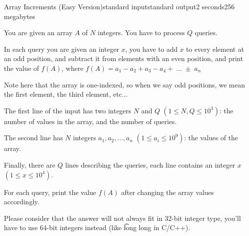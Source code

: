 \begin{problem}{Array Increments (Easy Version)}{standard input}{standard output}{2 seconds}{256 megabytes}

You are given an array $A$ of $N$ integers. You have to process $Q$ queries.

In each query you are given an integer $x$, you have to add $x$ to every element at an odd position, and subtract it from elements with an even position, and print the value of $f(A)$, where $f(A) = a_1 - a_2 + a_3 - a_4 +\; \dots \; \pm \; a_n$

Note here that the array is one-indexed, so when we say odd positions, we mean the first element, the third element, etc...

\InputFile
The first line of the input has two integers $N$ and $Q$ $(1 \leq N,Q \leq 10^3)$: the number of values in the array, and the number of queries.

The second line has $N$ integers $a_1, a_2, \dots, a_n$ $(1 \leq a_i \leq 10^9)$: the values of the array.


Finally, there are $Q$ lines describing the queries, each line contains an integer $x$ $(1 \leq x \leq 10^4)$.

\OutputFile
For each query, print the value $f(A)$ after changing the array values accordingly.

\Example

\begin{example}
%
\end{example}

\Note
Please consider that the answer will not always fit in 32-bit integer type, you'll have to use 64-bit integers instead (like \t{long long} in C/C++).

\end{problem}

